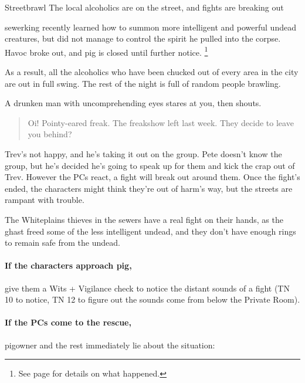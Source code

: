 \begin{multicols}{2}
{\N Streetbrawl}%
{The local alcoholics are on the street, and fights are breaking out}%
\label{ghastEscape}

\Gls{sewerking} recently learned how to summon more intelligent and powerful undead creatures, but did not manage to control the spirit he pulled into the corpse.
Havoc broke out, and \gls{pig} is closed until further notice.
\footnote{See page \pageref{pig_pantry} for details on what happened.}

As a result, all the alcoholics who have been chucked out of every area in the city are out in full swing.
The rest of the night is full of random people brawling.

\begin{boxtext}

A drunken man with uncomprehending eyes stares at you, then shouts.

\begin{quotation}

  Oi! Pointy-eared freak.  The freakshow left last week.  They decide to leave you behind?

\end{quotation}

\end{boxtext}

Trev's not happy, and he's taking it out on the group.
Pete doesn't know the group, but he's decided he's going to speak up for them and kick the crap out of Trev.
However the PCs react, a fight will break out around them.
Once the fight's ended, the characters might think they're out of harm's way, but the streets are rampant with trouble.


The Whiteplains thieves in the sewers have a real fight on their hands, as the ghast freed some of the less intelligent undead, and they don't have enough rings to remain safe from the undead.

\paragraph{If the characters approach \gls{pig},}
give them a Wits + Vigilance check  to notice the distant sounds of a fight (TN 10 to notice, TN 12 to figure out the sounds come from below the Private Room).

\paragraph{If the PCs come to the rescue,}
\gls{pigowner} and the rest immediately lie about the situation:


\end{multicols}

